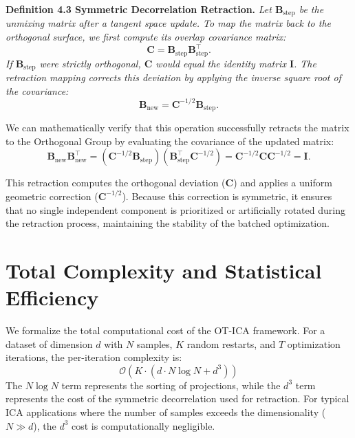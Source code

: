 \documentclass[12pt,a4paper,twoside,openany]{book}
\begin{document}
\vspace{0.5em}
\noindent\textbf{Definition 4.3 Symmetric Decorrelation Retraction.} \textit{Let $\mathbf{B}_{\text{step}}$ be the unmixing matrix after a tangent space update. 
To map the matrix back to the orthogonal surface, we first compute its overlap covariance matrix:}
\begin{equation}
    \mathbf{C} = \mathbf{B}_{\text{step}}\mathbf{B}_{\text{step}}^\top.
\end{equation}
\textit{If $\mathbf{B}_{\text{step}}$ were strictly orthogonal, $\mathbf{C}$ would equal the identity matrix $\mathbf{I}$. The retraction mapping corrects this deviation by applying the inverse square root of the covariance:}
\begin{equation}
    \mathbf{B}_{\text{new}} = \mathbf{C}^{-1/2} \mathbf{B}_{\text{step}}.
\end{equation}

We can mathematically verify that this operation successfully retracts the matrix to the Orthogonal Group by evaluating the covariance of the updated matrix:
\begin{equation}
    \mathbf{B}_{\text{new}}\mathbf{B}_{\text{new}}^\top = (\mathbf{C}^{-1/2} \mathbf{B}_{\text{step}}) (\mathbf{B}_{\text{step}}^\top \mathbf{C}^{-1/2}) = \mathbf{C}^{-1/2} \mathbf{C} \mathbf{C}^{-1/2} = \mathbf{I}.
\end{equation}

This retraction computes the orthogonal deviation ($\mathbf{C}$) 
and applies a uniform geometric correction ($\mathbf{C}^{-1/2}$). Because this correction is symmetric, it ensures that no single independent 
component is prioritized or artificially rotated during the retraction process, maintaining the stability of the batched optimization.

\section{Total Complexity and Statistical Efficiency}
\label{sec:total_complexity}
We formalize the total computational cost of the OT-ICA framework. 
For a dataset of dimension $d$ with $N$ samples, $K$ random restarts, and $T$ optimization iterations, the per-iteration complexity is:
\begin{equation}
    \mathcal{O}(K \cdot (d \cdot N \log N + d^3))
\end{equation}
The $N \log N$ term represents the sorting of projections, while the $d^3$ term represents the cost of the symmetric decorrelation 
used for retraction. For typical ICA applications where the number of samples exceeds the dimensionality 
($N \gg d$), the $d^3$ cost is computationally negligible. 
\end{document}
